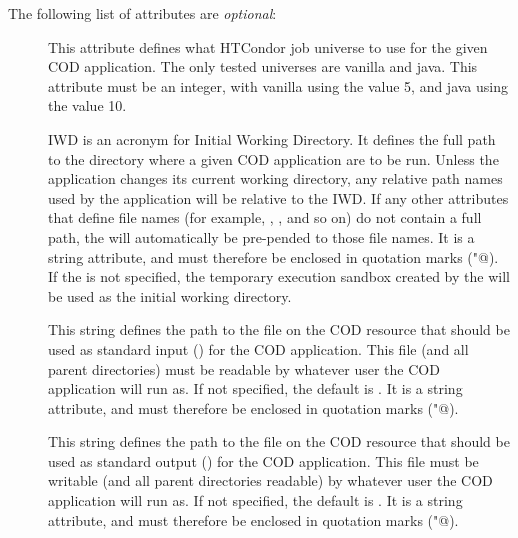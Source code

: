
The following list of attributes are \emph{optional}:

\begin{description}

 \item[] This attribute defines what HTCondor job
   universe to use for the given COD application.
   The only tested universes are vanilla and java.
   This attribute must be an integer, with vanilla using the value 5,
   and java using the value 10.

 \item[] IWD is an acronym for Initial Working Directory.
   It defines the full path to the directory where a given COD
   application are to be run.
   Unless the application changes its current working directory, any
   relative path names used by the application will be relative to
   the IWD.
   If any other attributes that define file names (for example,
   , , and so on) do not contain a full path, the
    will automatically be pre-pended to those file names.
   It is a string attribute, and must therefore be enclosed in 
   quotation marks (\verb@"@).
   If the  is not specified, the temporary execution sandbox
   created by the  will be used as the initial working
   directory.

 \item[] This string defines the path to the file on the
   COD resource that should be used as standard input () for 
   the COD application.
   This file (and all parent directories) must be readable by whatever
   user the COD application will run as.
   If not specified, the default is .
   It is a string attribute, and must therefore be enclosed in 
   quotation marks (\verb@"@).
 
 \item[] This string defines the path to the file on the
   COD resource that should be used as standard output ()
   for the COD application.
   This file must be writable (and all parent directories readable) by
   whatever user the COD application will run as.
   If not specified, the default is .
   It is a string attribute, and must therefore be enclosed in 
   quotation marks (\verb@"@).
 

\end{description}
